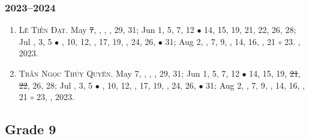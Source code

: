 \documentclass{article}
\begin{document}
\subsubsection{2023--2024}

\begin{enumerate}
	\item \textsc{Lê Tiến Đạt.} May \st{7}, , , , 29, 31; Jun 1, 5, 7, 12 $\bullet$ 14, 15, 19, 21, 22, 26, 28; Jul , 3, 5 $\bullet$ , 10, 12, , 17, 19, , 24, 26,  $\bullet$ 31; Aug 2, , 7, 9, , 14, 16, , 21 $\circ$ 23. , 2023.
	\item \textsc{Trần Ngọc Thúy Quyên.} May 7, , , , 29, 31; Jun 1, 5, 7, 12 $\bullet$ 14, 15, 19, \st{21}, \st{22}, 26, 28; Jul , 3, 5 $\bullet$ , 10, 12, , 17, 19, , 24, 26,  $\bullet$ 31; Aug 2, , 7, 9, , 14, 16, , 21 $\circ$ 23, , 2023.
\end{enumerate}


\subsection{Grade 9}
\end{document}
